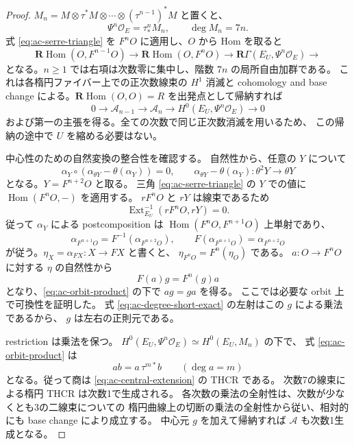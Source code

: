 \begin{proof}
$M_n=M\otimes\tau^*M\otimes\cdots\otimes(\tau^{n-1})^*M$ と置くと、
\[
                  \Psi^n\mathcal O_E=\tau_*^nM_n,
                  \qquad\deg M_n=7n.
\]
式 \eqref{eq:ac-serre-triangle} を $F^nO$ に適用し、$O$ から Hom を取ると
\begin{equation}\label{eq:ac-degree-triangle}
 \mathbf R\operatorname{Hom}(O,F^{n-1}O)
 \longrightarrow\mathbf R\operatorname{Hom}(O,F^nO)
 \longrightarrow\mathbf R\Gamma(E_U,\Psi^n\mathcal O_E)
 \longrightarrow
\end{equation}
となる。$n\ge1$ では右項は次数零に集中し、階数 $7n$ の局所自由加群である。
これは各楕円ファイバー上での正次数線束の $H^1$ 消滅と cohomology and base change
による。$\mathbf R\operatorname{Hom}(O,O)=R$ を出発点として帰納すれば
\begin{equation}\label{eq:ac-degree-short-exact}
 0\longrightarrow\mathscr A_{n-1}\longrightarrow\mathscr A_n
 \longrightarrow H^0(E_U,\Psi^n\mathcal O_E)\longrightarrow0
\end{equation}
および第一の主張を得る。全ての次数で同じ正次数消滅を用いるため、
この帰納の途中で $U$ を縮める必要はない。

中心性のための自然変換の整合性を確認する。
自然性から、任意の $Y$ について
\[
 \alpha_Y\circ(\alpha_{\theta Y}-\theta(\alpha_Y))=0,
 \qquad
 \alpha_{\theta Y}-\theta(\alpha_Y)\colon\theta^2Y\to\theta Y
\]
となる。$Y=F^{n+2}O$ と取る。
三角 \eqref{eq:ac-serre-triangle} の $Y$ での値に
$\operatorname{Hom}(F^nO,-)$ を適用する。
$rF^nO$ と $rY$ は線束であるため
\[
 \operatorname{Ext}^{-1}_{E_U}(rF^nO,rY)=0.
\]
従って $\alpha_Y$ による postcomposition は
$\operatorname{Hom}(F^nO,F^{n+1}O)$ 上単射であり、
\[
 \alpha_{F^{n+1}O}=F^{-1}(\alpha_{F^{n+2}O}),\qquad
 F(\alpha_{F^{n+1}O})=\alpha_{F^{n+2}O}
\]
が従う。$\eta_X=\alpha_{FX}\colon X\to FX$ と書くと、
$\eta_{F^nO}=F^n(\eta_O)$ である。
$a\colon O\to F^nO$ に対する $\eta$ の自然性から
\[
                  F(a)g=F^n(g)a
\]
となり、\eqref{eq:ac-orbit-product} の下で $ag=ga$ を得る。
ここでは必要な orbit 上で可換性を証明した。
式 \eqref{eq:ac-degree-short-exact} の左射はこの $g$ による乗法であるから、
$g$ は左右の正則元である。

restriction は乗法を保つ。
$H^0(E_U,\Psi^n\mathcal O_E)\simeq H^0(E_U,M_n)$ の下で、
式 \eqref{eq:ac-orbit-product} は
\[
        a b=a\,\tau^{m*}b\qquad(\deg a=m)
\]
となる。従って商は \eqref{eq:ac-central-extension} の THCR である。
次数7の線束による楕円 THCR は次数1で生成される。
各次数の乗法の全射性は、次数が少なくとも3の二線束についての
楕円曲線上の切断の乗法の全射性から従い、相対的にも base change により成立する。
中心元 $g$ を加えて帰納すれば $\mathscr A$ も次数1生成となる。


\end{proof}
